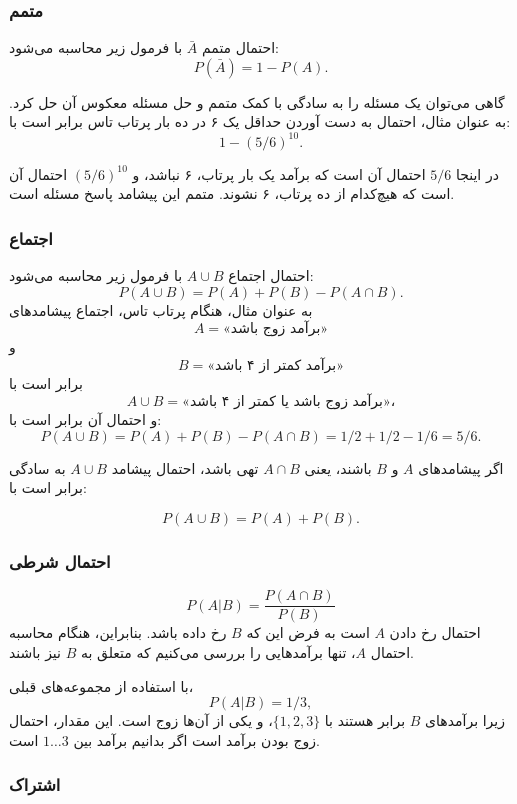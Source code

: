 \subsubsection{متمم}

احتمال متمم
$\bar A$ با فرمول زیر محاسبه می‌شود:
\[P(\bar A)=1-P(A).\]

گاهی می‌توان یک مسئله را به سادگی
با کمک متمم و حل مسئله معکوس آن حل کرد.
به عنوان مثال، احتمال به دست آوردن
حداقل یک ۶ در ده بار پرتاب تاس برابر است با:
\[1-(5/6)^{10}.\]

در اینجا $5/6$ احتمال آن است که برآمد
یک بار پرتاب، ۶ نباشد، و
$(5/6)^{10}$ احتمال آن است که هیچ‌کدام از
ده پرتاب، ۶ نشوند.
متمم این پیشامد پاسخ مسئله است.

\subsubsection{اجتماع}

احتمال اجتماع $A \cup B$
با فرمول زیر محاسبه می‌شود:
\[P(A \cup B)=P(A)+P(B)-P(A \cap B).\]
به عنوان مثال، هنگام پرتاب تاس،
اجتماع پیشامدهای
\[A=\textrm{«برآمد زوج باشد»}\]
و
\[B=\textrm{«برآمد کمتر از ۴ باشد»}\]
برابر است با
\[A \cup B=\textrm{«برآمد زوج باشد یا کمتر از ۴ باشد»}،\]
و احتمال آن برابر است با:
\[P(A \cup B) = P(A)+P(B)-P(A \cap B)=1/2+1/2-1/6=5/6.\]

اگر پیشامدهای $A$ و $B$  باشند، یعنی
$A \cap B$ تهی باشد،
احتمال پیشامد $A \cup B$ به سادگی برابر است با:

\[P(A \cup B)=P(A)+P(B).\]

\subsubsection{احتمال شرطی}


\[P(A | B) = \frac{P(A \cap B)}{P(B)}\]
احتمال رخ دادن $A$ است
به فرض این که $B$ رخ داده باشد.
بنابراین، هنگام محاسبه
احتمال $A$، تنها برآمدهایی را بررسی می‌کنیم
که متعلق به $B$ نیز باشند.

با استفاده از مجموعه‌های قبلی،
\[P(A | B)= 1/3,\]
زیرا برآمدهای $B$ برابر هستند با
$\{1,2,3\}$، و یکی از آن‌ها زوج است.
این مقدار، احتمال زوج بودن برآمد است
اگر بدانیم برآمد بین $1 \ldots 3$ است.

\subsubsection{اشتراک}

